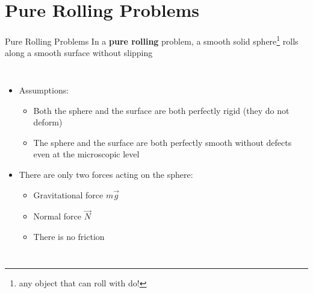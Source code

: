 \documentclass[12pt,compress,aspectratio=169]{beamer}
\begin{document}
%
%



\section{Pure Rolling Problems}

\begin{frame}{Pure Rolling Problems}
  In a \textbf{pure rolling} problem, a smooth solid sphere\footnote{any object
    that can roll with do!} rolls along a smooth surface without slipping
  \begin{columns}
    \centering

    \begin{itemize}
    \item Assumptions:
      \begin{itemize}
      \item Both the sphere and the surface are both perfectly rigid (they
        do not deform)
      \item The sphere and the surface are both perfectly smooth without defects
        even at the microscopic level
      \end{itemize}
    \item There are only two forces acting on the sphere:
      \begin{itemize}
      \item Gravitational force $m\vec g$
      \item Normal force $\vec N$
      \item There is no friction
      \end{itemize}
    \end{itemize}
  \end{columns}
\end{frame}
\end{document}
